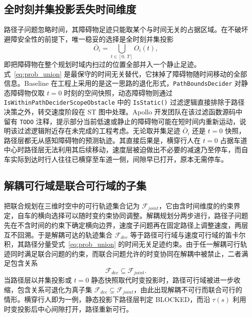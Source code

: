 \documentclass[a4paper,11pt]{ctexart}
\theoremstyle{definition}
\begin{document}
\subsection{全时刻并集投影丢失时间维度}
\label{subsec:union_projection}

路径子问题忽略时间，其障碍物足迹只能取某个与时间无关的占据区域。在不破坏避障安全性的前提下，唯一稳妥的选择是全时刻并集投影
\begin{equation}
    \bar{O}_i = \bigcup_{t \in [0,\,T]} O_i(t),
    \label{eq:prob_union}
\end{equation}
即把障碍物在整个规划时域内扫过的位置全部并入一个静止足迹。式~\eqref{eq:prob_union} 是最保守的时间无关替代，它抹掉了障碍物随时间移动的全部信息。Baseline 在工程上采用的是这一思路的退化形式，\texttt{PathBoundsDecider} 对静态障碍物仅取 $t{=}0$ 时刻的空间快照，动态障碍物则通过 \texttt{IsWithinPathDeciderScopeObstacle} 中的 \texttt{IsStatic()} 过滤逻辑直接排除于路径决策之外，转交速度阶段在 ST 图中处理。Apollo 开发团队在该过滤函数源码中留有 \texttt{TODO} 注释，提示部分当前低速或静止的障碍物可能在短时间内重新运动，说明该过滤逻辑附近存在未完成的工程考虑。无论取并集足迹 $\bar{O}_i$ 还是 $t{=}0$ 快照，路径层都无从感知障碍物的预测轨迹。其直接后果是，横穿行人在 $t{=}0$ 占据车道中心时路径层无法利用其后续移动，速度层被迫做出不必要的减速乃至停车，而自车实际到达时行人往往已横穿至车道一侧，间隙早已打开，原本无需停车。

\subsection{解耦可行域是联合可行域的子集}
\label{subsec:feasibility_subset}

把联合规划在三维时空中的可行轨迹集合记为 $\mathcal{F}_{joint}$，它由含时间维度的约束界定，自车的横向选择可以随时变约束协同调整。解耦规划分两步进行，路径子问题先在不含时间的约束下确定横向边界，速度子问题再在固定路径上调整速度，两层互不回溯。于是解耦可达的轨迹集合 $\mathcal{F}_{dec}$ 等于路径可行域与速度可行域的笛卡尔积，其路径分量受式~\eqref{eq:prob_union} 的时间无关足迹约束。由于任一解耦可行轨迹同时满足联合问题的约束，而联合问题允许的时变协同在解耦中被禁止，二者满足包含关系
\begin{equation}
    \mathcal{F}_{dec} \subseteq \mathcal{F}_{joint}.
    \label{eq:prob_subset}
\end{equation}
当路径层以并集投影或 $t{=}0$ 静态快照取代时变投影时，路径可行域被进一步收缩，包含关系可退化为真子集 $\mathcal{F}_{dec} \subsetneq \mathcal{F}_{joint}$，由此出现解耦不可行而联合可行的情形。横穿行人即为一例，静态投影下路径层判定 BLOCKED，而沿 $\tau(s)$ 利用时变投影后中心间隙打开，路径重新可行。
\end{document}
